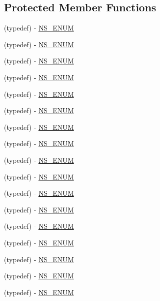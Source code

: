 \subsection*{Protected Member Functions}
\begin{DoxyCompactItemize}
\item 
(typedef) -\/ \hyperlink{interface_p_v_eye_camera_settings_def_a5071728de830ce618137bebfdb361503}{N\+S\+\_\+\+E\+N\+UM}
\item 
(typedef) -\/ \hyperlink{interface_p_v_eye_camera_settings_def_a4a2fdd2d736dbfaaececcb158d3627d2}{N\+S\+\_\+\+E\+N\+UM}
\item 
(typedef) -\/ \hyperlink{interface_p_v_eye_camera_settings_def_ab39b7646bf8021557dd21d9efbf55106}{N\+S\+\_\+\+E\+N\+UM}
\item 
(typedef) -\/ \hyperlink{interface_p_v_eye_camera_settings_def_a09b342c82facb1fe38f51373e91d3e0b}{N\+S\+\_\+\+E\+N\+UM}
\item 
(typedef) -\/ \hyperlink{interface_p_v_eye_camera_settings_def_a48da3445b5988e948bcbb9c43b45e090}{N\+S\+\_\+\+E\+N\+UM}
\item 
(typedef) -\/ \hyperlink{interface_p_v_eye_camera_settings_def_a0a6912668cd8b13de829a5965efda1f7}{N\+S\+\_\+\+E\+N\+UM}
\item 
(typedef) -\/ \hyperlink{interface_p_v_eye_camera_settings_def_a20cca0481c436c030b368d561ec560c2}{N\+S\+\_\+\+E\+N\+UM}
\item 
(typedef) -\/ \hyperlink{interface_p_v_eye_camera_settings_def_a0804cafe16d16724868c6405fa753c7a}{N\+S\+\_\+\+E\+N\+UM}
\item 
(typedef) -\/ \hyperlink{interface_p_v_eye_camera_settings_def_ae9ab6adbb286e0178bdff73f30a67028}{N\+S\+\_\+\+E\+N\+UM}
\item 
(typedef) -\/ \hyperlink{interface_p_v_eye_camera_settings_def_a5bfb9601dbbfc92413adbd1d89a71320}{N\+S\+\_\+\+E\+N\+UM}
\item 
(typedef) -\/ \hyperlink{interface_p_v_eye_camera_settings_def_a72af9f8c93ab40069cd9a63e753c57f9}{N\+S\+\_\+\+E\+N\+UM}
\item 
(typedef) -\/ \hyperlink{interface_p_v_eye_camera_settings_def_afa6a248e45959a999b5307f3dbf38fa7}{N\+S\+\_\+\+E\+N\+UM}
\item 
(typedef) -\/ \hyperlink{interface_p_v_eye_camera_settings_def_a4c609086f7a2330149d80ba8b082779a}{N\+S\+\_\+\+E\+N\+UM}
\item 
(typedef) -\/ \hyperlink{interface_p_v_eye_camera_settings_def_aa90cbc3d335fad076905f4702b720aeb}{N\+S\+\_\+\+E\+N\+UM}
\item 
(typedef) -\/ \hyperlink{interface_p_v_eye_camera_settings_def_af598fa70d30fe897cfabf70c44a8aabd}{N\+S\+\_\+\+E\+N\+UM}
\item 
(typedef) -\/ \hyperlink{interface_p_v_eye_camera_settings_def_afc5fd6fd6ffcc4165f823ca624af0c8d}{N\+S\+\_\+\+E\+N\+UM}
\item 
(typedef) -\/ \hyperlink{interface_p_v_eye_camera_settings_def_aae60f89a6b838c13e91d1321666ddf46}{N\+S\+\_\+\+E\+N\+UM}
\end{DoxyCompactItemize}


